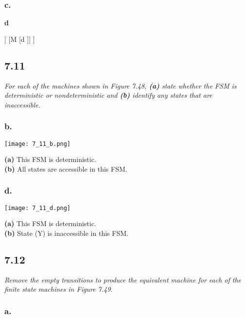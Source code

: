 \documentclass[a4paper,man,natbib]{apa6}
\begin{document}
\subsubsection{c.}
\textbf{d} \\
\begin{center}\begin{forest}
[<I> 
	[F [$\epsilon$ ]]
	[M [d ]]
]
\end{forest}\end{center}
\clearpage

\subsection{7.11}
\emph{For each of the machines shown in Figure 7.48, \textbf{(a)} state whether the FSM is deterministic or nondeterministic and \textbf{(b)} identify any states that are inaccessible.}

\subsubsection{b.}
\begin{center} \texttt{[image: 7\_11\_b.png]} \\ \end{center}
\noindent
\textbf{(a)} 
This FSM is deterministic. \\
\noindent
\textbf{(b)} 
All states are accessible in this FSM. \\
\subsubsection{d.}
\begin{center} \texttt{[image: 7\_11\_d.png]} \\ \end{center}
\noindent
\textbf{(a)} 
This FSM is deterministic. \\
\noindent
\textbf{(b)} 
State (Y) is inaccessible in this FSM.\\
\clearpage

\subsection{7.12}
\emph{Remove the empty transitions to produce the equivalent machine for each of the finite state machines in Figure 7.49.}

\subsubsection{a.}
\end{document}
